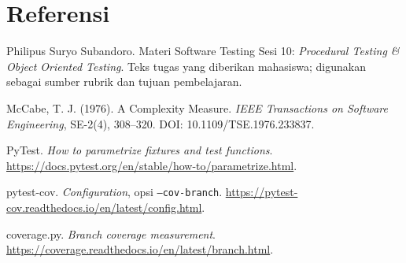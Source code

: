 \documentclass[11pt,a4paper]{article}
\begin{document}
\section{Referensi}
\begin{enumerate}[label={[\arabic*]},itemsep=5pt]
\item Philipus Suryo Subandoro. Materi Software Testing Sesi 10:
\textit{Procedural Testing \& Object Oriented Testing}. Teks tugas yang
diberikan mahasiswa; digunakan sebagai sumber rubrik dan tujuan pembelajaran.
\item McCabe, T. J. (1976). A Complexity Measure. \textit{IEEE Transactions on
Software Engineering}, SE-2(4), 308--320. DOI: 10.1109/TSE.1976.233837.
\item PyTest. \textit{How to parametrize fixtures and test functions}.
\url{https://docs.pytest.org/en/stable/how-to/parametrize.html}.
\item pytest-cov. \textit{Configuration}, opsi \texttt{--cov-branch}.
\url{https://pytest-cov.readthedocs.io/en/latest/config.html}.
\item coverage.py. \textit{Branch coverage measurement}.
\url{https://coverage.readthedocs.io/en/latest/branch.html}.
\end{enumerate}
\clearpage
\end{document}
